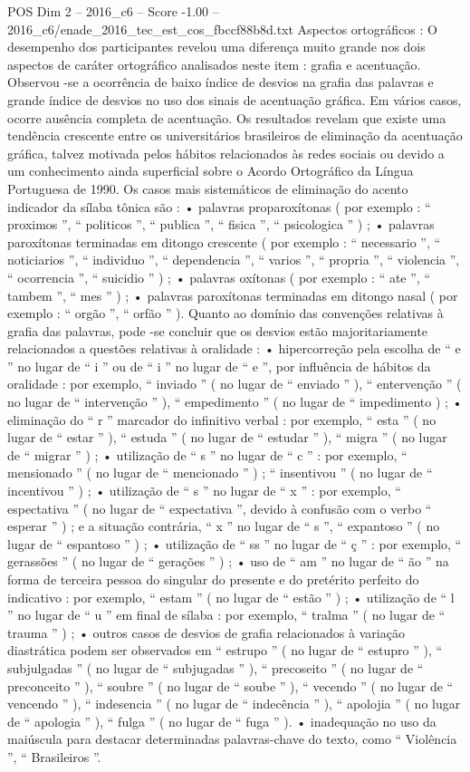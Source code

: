 \begin{textsample}{POS Dim 2 – 2016\_c6 – Score -1.00 – 2016\_c6/enade\_2016\_tec\_est\_cos\_fbccf88b8d.txt}
Aspectos ortográficos : O desempenho dos participantes revelou uma diferença muito grande nos dois aspectos de caráter ortográfico analisados neste item : grafia e acentuação.
Observou -se a ocorrência de baixo índice de desvios na grafia das palavras e grande índice de desvios no uso dos sinais de acentuação gráfica.
Em vários casos, ocorre ausência completa de acentuação.
Os resultados revelam que existe uma tendência crescente entre os universitários brasileiros de eliminação da acentuação gráfica, talvez motivada pelos hábitos relacionados às redes sociais ou devido a um conhecimento ainda superficial sobre o Acordo Ortográfico da Língua Portuguesa de 1990.
Os casos mais sistemáticos de eliminação do acento indicador da sílaba tônica são : • palavras proparoxítonas ( por exemplo : “ proximos ”, “ politicos ”, “ publica ”, “ fisica ”, “ psicologica ” ) ; • palavras paroxítonas terminadas em ditongo crescente ( por exemplo : “ necessario ”, “ noticiarios ”, “ individuo ”, “ dependencia ”, “ varios ”, “ propria ”, “ violencia ”, “ ocorrencia ”, “ suicidio ” ) ; • palavras oxítonas ( por exemplo : “ ate ”, “ tambem ”, “ mes ” ) ; • palavras paroxítonas terminadas em ditongo nasal ( por exemplo : “ orgão ”, “ orfão ” ).
Quanto ao domínio das convenções relativas à grafia das palavras, pode -se concluir que os desvios estão majoritariamente relacionados a questões relativas à oralidade : • hipercorreção pela escolha de “ e ” no lugar de “ i ” ou de “ i ” no lugar de “ e ”, por influência de hábitos da oralidade : por exemplo, “ inviado ” ( no lugar de “ enviado ” ), “ entervenção ” ( no lugar de “ intervenção ” ), “ empedimento ” ( no lugar de “ impedimento ) ; • eliminação do “ r ” marcador do infinitivo verbal : por exemplo, “ esta ” ( no lugar de “ estar ” ), “ estuda ” ( no lugar de “ estudar ” ), “ migra ” ( no lugar de “ migrar ” ) ; • utilização de “ s ” no lugar de “ c ” : por exemplo, “ mensionado ” ( no lugar de “ mencionado ” ) ; “ insentivou ” ( no lugar de “ incentivou ” ) ; • utilização de “ s ” no lugar de “ x ” : por exemplo, “ espectativa ” ( no lugar de “ expectativa ”, devido à confusão com o verbo “ esperar ” ) ; e a situação contrária, “ x ” no lugar de “ s ”, “ expantoso ” ( no lugar de “ espantoso ” ) ; • utilização de “ ss ” no lugar de “ ç ” : por exemplo, “ gerassões ” ( no lugar de “ gerações ” ) ; • uso de “ am ” no lugar de “ ão ” na forma de terceira pessoa do singular do presente e do pretérito perfeito do indicativo : por exemplo, “ estam ” ( no lugar de “ estão ” ) ; • utilização de “ l ” no lugar de “ u ” em final de sílaba : por exemplo, “ tralma ” ( no lugar de “ trauma ” ) ; • outros casos de desvios de grafia relacionados à variação diastrática podem ser observados em “ estrupo ” ( no lugar de “ estupro ” ), “ subjulgadas ” ( no lugar de “ subjugadas ” ), “ precoseito ” ( no lugar de “ preconceito ” ), “ soubre ” ( no lugar de “ soube ” ), “ vecendo ” ( no lugar de “ vencendo ” ), “ indesencia ” ( no lugar de “ indecência ” ), “ apolojia ” ( no lugar de “ apologia ” ), “ fulga ” ( no lugar de “ fuga ” ). • inadequação no uso da maiúscula para destacar determinadas palavras-chave do texto, como “ Violência ”, “ Brasileiros ”.

\end{textsample}
